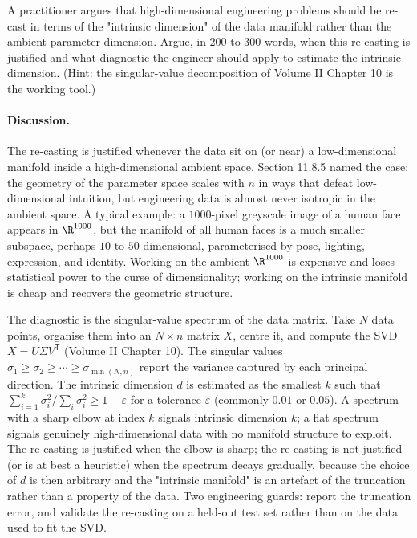 \begin{exercise}
A practitioner argues that high-dimensional engineering problems
should be re-cast in terms of the "intrinsic dimension" of the
data manifold rather than the ambient parameter dimension. Argue,
in 200 to 300 words, when this re-casting is justified and what
diagnostic the engineer should apply to estimate the intrinsic
dimension. (Hint: the singular-value decomposition of Volume II
Chapter 10 is the working tool.)

\paragraph{Discussion.} The re-casting is justified whenever the
data sit on (or near) a low-dimensional manifold inside a
high-dimensional ambient space. Section 11.8.5 named the case: the
geometry of the parameter space scales with $n$ in ways that defeat
low-dimensional intuition, but engineering data is almost never
isotropic in the ambient space. A typical example: a $1000$-pixel
greyscale image of a human face appears in $\R^{1000}$, but the
manifold of all human faces is a much smaller subspace, perhaps
$10$ to $50$-dimensional, parameterised by pose, lighting,
expression, and identity. Working on the ambient $\R^{1000}$ is
expensive and loses statistical power to the curse of
dimensionality; working on the intrinsic manifold is cheap and
recovers the geometric structure.

The diagnostic is the singular-value spectrum of the data matrix.
Take $N$ data points, organise them into an $N \times n$ matrix
$X$, centre it, and compute the SVD $X = U \Sigma V^{\mathsf{T}}$
(Volume II Chapter 10). The singular values $\sigma_{1} \geq
\sigma_{2} \geq \cdots \geq \sigma_{\min(N, n)}$ report the
variance captured by each principal direction. The intrinsic
dimension $d$ is estimated as the smallest $k$ such that
$\sum_{i = 1}^{k} \sigma_{i}^{2} / \sum_{i} \sigma_{i}^{2} \geq
1 - \varepsilon$ for a tolerance $\varepsilon$ (commonly $0.01$ or
$0.05$). A spectrum with a sharp elbow at index $k$ signals
intrinsic dimension $k$; a flat spectrum signals genuinely
high-dimensional data with no manifold structure to exploit. The
re-casting is justified when the elbow is sharp; the re-casting is
not justified (or is at best a heuristic) when the spectrum decays
gradually, because the choice of $d$ is then arbitrary and the
"intrinsic manifold" is an artefact of the truncation rather than
a property of the data. Two engineering guards: report the
truncation error, and validate the re-casting on a held-out test
set rather than on the data used to fit the SVD.
\end{exercise}

